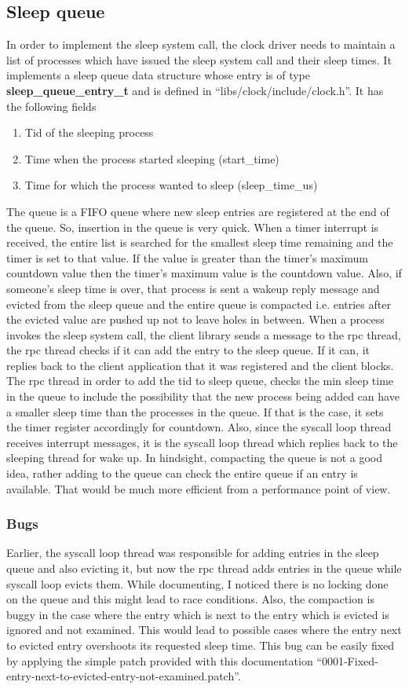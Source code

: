\documentclass[a4paper, 11pt]{article}
\begin{document}
\subsection{Sleep queue}
In order to implement the sleep system call, the clock driver needs to
maintain a list of processes which have issued the sleep system call
and their sleep times. It implements a sleep queue data structure
whose entry is of type {\bf sleep\_queue\_entry\_t} and is defined in
``libs/clock/include/clock.h''. It has the following fields
\begin{enumerate}
\item Tid of the sleeping process
\item Time when the process started sleeping (start\_time)
\item Time for which the process wanted to sleep (sleep\_time\_us)
\end{enumerate}
The queue is a FIFO queue where new sleep entries are registered at
the end of the queue. So, insertion in the queue is very quick. When a
timer interrupt is received, the entire list is searched for the
smallest sleep time remaining and the timer is set to that value. If
the value is greater than the timer's maximum countdown value then the
timer's maximum value is the countdown value. Also, if someone's sleep
time is over, that process is sent a wakeup reply message and evicted
from the sleep queue and the entire queue is compacted i.e. entries
after the evicted value are pushed up not to leave holes in
between. When a process invokes the sleep system call, the client
library sends a message to the rpc thread, the rpc thread checks if it
can add the entry to the sleep queue. If it can, it replies back to
the client application that it was registered and the client
blocks. The rpc thread in order to add the tid to sleep queue, checks
the min sleep time in the queue to include the possibility that the
new process being added can have a smaller sleep time than the
processes in the queue. If that is the case, it sets the timer
register accordingly for countdown. Also, since the syscall loop
thread receives interrupt messages, it is the syscall loop thread which
replies back to the sleeping thread for wake up. In hindsight,
compacting the queue is not a good idea, rather adding to the queue
can check the entire queue if an entry is available. That would be
much more efficient from a performance point of view. 
\subsubsection{Bugs}
Earlier, the syscall loop thread was responsible for adding entries in
the sleep queue and also evicting it, but now the rpc thread adds
entries in the queue while syscall loop evicts them. While
documenting, I noticed there is no locking done on the queue and this
might lead to race conditions. Also, the compaction is buggy in the
case where the entry which is next to the entry which is evicted is
ignored and not examined. This would lead to possible cases where the
entry next to evicted entry overshoots its requested sleep time.
This bug can be easily fixed by applying the simple
patch provided with this documentation
``0001-Fixed-entry-next-to-evicted-entry-not-examined.patch''. 
\newpage
\end{document}
